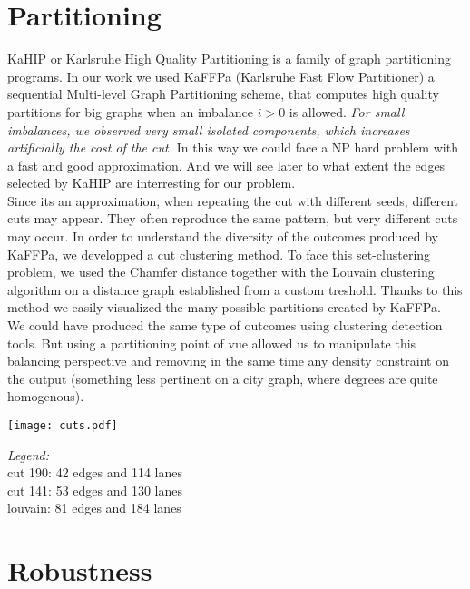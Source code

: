 \documentclass{article}
\begin{document}
\section{Partitioning}
KaHIP or Karlsruhe High Quality Partitioning is a family of graph partitioning programs. In our work we used KaFFPa (Karlsruhe Fast Flow Partitioner) a sequential Multi-level Graph Partitioning scheme, that computes high quality partitions for big graphs when an imbalance $i > 0$ is allowed. \emph{For small imbalances, we observed very small isolated components, which increases artificially the cost of the cut.} In this way we could face a NP hard problem with a fast and good approximation. And we will see later to what extent the edges selected by KaHIP are interresting for our problem.\\
Since its an approximation, when repeating the cut with different seeds, different cuts may appear. They often reproduce the same pattern, but very different cuts may occur. In order to understand the diversity of the outcomes produced by KaFFPa, we developped a cut clustering method. To face this set-clustering problem, we used the Chamfer distance together with the Louvain clustering algorithm on a distance graph established from a custom treshold. Thanks to this method we easily visualized the many possible partitions created by KaFFPa.\\
We could have produced the same type of outcomes using clustering detection tools. But using a partitioning point of vue allowed us to manipulate this balancing perspective and removing in the same time any density constraint on the output (something less pertinent on a city graph, where degrees are quite homogenous).
\begin{multicols}{2}
    \texttt{[image: cuts.pdf]}
    \begin{boxB}
        \begin{center}
            \emph{Legend:}\\
            \color{red} cut 190: 42 edges and 114 lanes\\
            \color{violet} cut 141: 53 edges and 130 lanes\\
            \color{orange} louvain: 81 edges and 184 lanes
        \end{center}
    \end{boxB}
\end{multicols}
    
\section{Robustness}
\end{document}
